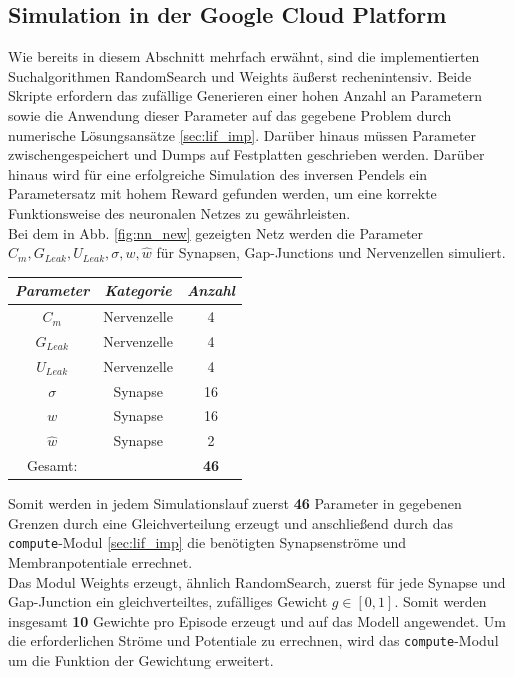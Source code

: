 	\subsection{Simulation in der Google Cloud Platform\textsuperscript{\textregistered}}
		Wie bereits in diesem Abschnitt mehrfach erwähnt, sind die implementierten Suchalgorithmen RandomSearch und Weights äußerst rechenintensiv. Beide Skripte erfordern das zufällige Generieren einer hohen Anzahl an Parametern sowie die Anwendung dieser Parameter auf das gegebene Problem durch numerische Lösungsansätze \ref{sec:lif_imp}. Darüber hinaus müssen Parameter zwischengespeichert und Dumps auf Festplatten geschrieben werden. Darüber hinaus wird für eine erfolgreiche Simulation des inversen Pendels ein Parametersatz mit hohem Reward gefunden werden, um eine korrekte Funktionsweise des neuronalen Netzes zu gewährleisten.\\
		Bei dem in Abb. \ref{fig:nn_new} gezeigten Netz werden die Parameter $C_m, G_{Leak}, U_{Leak}, \sigma, w, \hat{w}$ für Synapsen, Gap-Junctions und Nervenzellen simuliert.
		\begin{center}
			\begin{tabular}{c@{\hskip 0.5cm}c@{\hskip 0.5cm}c@{\hskip 0.5cm}}    \toprule
				\setlength{\tabcolsep}{50pt}
				\renewcommand{\arraystretch}{1.5}
				\emph{Parameter}	& \emph{Kategorie}  & \emph{Anzahl} \\\midrule
				$C_m$				& Nervenzelle		& 4				\\ 
				$G_{Leak}$	 		& Nervenzelle		& 4				\\
				$U_{Leak}$	 		& Nervenzelle		& 4				\\
				$\sigma$			& Synapse			& 16			\\
				$w$					& Synapse			& 16			\\ 
				$\hat{w}$			& Synapse			& 2				\\\bottomrule
				Gesamt:				&					& \textbf{46}	\\
				\hline
			\end{tabular}
		\end{center}
		Somit werden in jedem Simulationslauf zuerst \textbf{46} Parameter in gegebenen Grenzen durch eine Gleichverteilung erzeugt und anschließend durch das \texttt{compute}-Modul \ref{sec:lif_imp} die benötigten Synapsenströme und Membranpotentiale errechnet.\\
		Das Modul Weights erzeugt, ähnlich RandomSearch, zuerst für jede Synapse und Gap-Junction ein gleichverteiltes, zufälliges Gewicht $g\in[0,1]$. Somit werden insgesamt \textbf{10} Gewichte pro Episode erzeugt und auf das Modell angewendet. Um die erforderlichen Ströme und Potentiale zu errechnen, wird das \texttt{compute}-Modul um die Funktion der Gewichtung erweitert.\\
